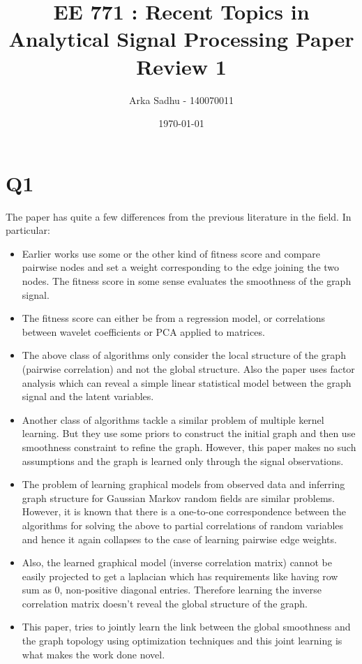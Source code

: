 \documentclass{article}
\title{EE 771 : Recent Topics in Analytical Signal Processing Paper Review 1}
\author{Arka Sadhu - 140070011}
\date{\today}
\begin{document}
\maketitle

\section*{Q1}
The paper has quite a few differences from the previous literature in the field. In particular:
\begin{itemize}
\item Earlier works use some or the other kind of fitness score and compare pairwise nodes and set a weight corresponding to the edge joining the two nodes. The fitness score in some sense evaluates the smoothness of the graph signal.
\item The fitness score can either be from a regression model, or correlations between wavelet coefficients or PCA applied to matrices.
\item The above class of algorithms only consider the local structure of the graph (pairwise correlation) and not the global structure. Also the paper uses factor analysis which can reveal a simple linear statistical model between the graph signal and the latent variables.
\item Another class of algorithms tackle a similar problem of multiple kernel learning. But they use some priors to construct the initial graph and then use smoothness constraint to refine the graph. However, this paper makes no such assumptions and the graph is learned only through the signal observations.
\item The problem of learning graphical models from observed data and inferring graph structure for Gaussian Markov random fields are similar problems. However, it is known that there is a one-to-one correspondence between the algorithms for solving the above to partial correlations of random variables and hence it again collapses to the case of learning pairwise edge weights.
\item Also, the learned graphical model (inverse correlation matrix) cannot be easily projected to get a laplacian which has requirements like having row sum as 0, non-positive diagonal entries. Therefore learning the inverse correlation matrix doesn't reveal the global structure of the graph.
\item This paper, tries to jointly learn the link between the global smoothness and the graph topology using optimization techniques and this joint learning is what makes the work done novel.
\end{itemize}
\end{document}
